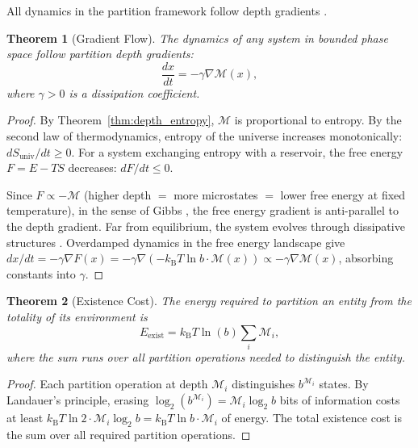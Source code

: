\documentclass[twocolumn,10pt,a4paper]{article}
\newtheorem{theorem}{Theorem}[section]
\theoremstyle{definition}
\theoremstyle{remark}
\newcommand{\kB}{k_{\mathrm{B}}}
\newcommand{\Depth}{\mathcal{M}}
\begin{document}
All dynamics in the partition framework follow depth gradients \citep{Sachikonye2024a}.

\begin{theorem}[Gradient Flow]
\label{thm:gradient}
The dynamics of any system in bounded phase space follow partition depth gradients:
\begin{equation}
    \frac{dx}{dt} = -\gamma \nabla \Depth(x),
    \label{eq:gradient_flow}
\end{equation}
where $\gamma > 0$ is a dissipation coefficient.
\end{theorem}

\begin{proof}
By Theorem~\ref{thm:depth_entropy}, $\Depth$ is proportional to entropy. By the second law of thermodynamics, entropy of the universe increases monotonically: $dS_{\mathrm{univ}}/dt \geq 0$. For a system exchanging entropy with a reservoir, the free energy $F = E - TS$ decreases: $dF/dt \leq 0$.

Since $F \propto -\Depth$ (higher depth $=$ more microstates $=$ lower free energy at fixed temperature), in the sense of Gibbs \citep{Gibbs1875}, the free energy gradient is anti-parallel to the depth gradient. Far from equilibrium, the system evolves through dissipative structures \citep{Prigogine1967}. Overdamped dynamics in the free energy landscape give $dx/dt = -\gamma \nabla F(x) = -\gamma \nabla(-\kB T \ln b \cdot \Depth(x)) \propto -\gamma \nabla \Depth(x)$, absorbing constants into $\gamma$.
\end{proof}

\begin{theorem}[Existence Cost]
\label{thm:existence_cost}
The energy required to partition an entity from the totality of its environment is
\begin{equation}
    E_{\mathrm{exist}} = \kB T \ln(b) \sum_i \Depth_i,
    \label{eq:existence_cost}
\end{equation}
where the sum runs over all partition operations needed to distinguish the entity.
\end{theorem}

\begin{proof}
Each partition operation at depth $\Depth_i$ distinguishes $b^{\Depth_i}$ states. By Landauer's principle, erasing $\log_2(b^{\Depth_i}) = \Depth_i \log_2 b$ bits of information costs at least $\kB T \ln 2 \cdot \Depth_i \log_2 b = \kB T \ln b \cdot \Depth_i$ of energy. The total existence cost is the sum over all required partition operations.
\end{proof}
\end{document}
